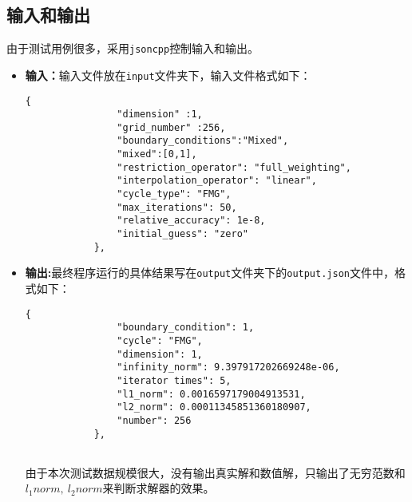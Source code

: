 \documentclass[UTF8]{ctexart}
\begin{document}
	\subsection{输入和输出}
	由于测试用例很多，采用\texttt{jsoncpp}控制输入和输出。
	\begin{itemize}
		\item  \textbf{输入：}输入文件放在\texttt{input}文件夹下，输入文件格式如下：
		\begin{lstlisting}[style=json]
			  {
				"dimension" :1,
				"grid_number" :256,
				"boundary_conditions":"Mixed",
				"mixed":[0,1],
				"restriction_operator": "full_weighting",  
				"interpolation_operator": "linear",        
				"cycle_type": "FMG",                 
				"max_iterations": 50,
				"relative_accuracy": 1e-8,
				"initial_guess": "zero"                
			},
		\end{lstlisting}
		\item \textbf{输出:}最终程序运行的具体结果写在\texttt{output}文件夹下的\texttt{output.json}文件中，格式如下：
		\begin{lstlisting}[style=json]
			    {
				"boundary_condition": 1,
				"cycle": "FMG",
				"dimension": 1,
				"infinity_norm": 9.397917202669248e-06,
				"iterator times": 5,
				"l1_norm": 0.0016597179004913531,
				"l2_norm": 0.00011345851360180907,
				"number": 256
			},
			
		\end{lstlisting}
		由于本次测试数据规模很大，没有输出真实解和数值解，只输出了无穷范数和$l_1 norm,\ l_2 norm$来判断求解器的效果。
	\end{itemize}

	
\end{document}
